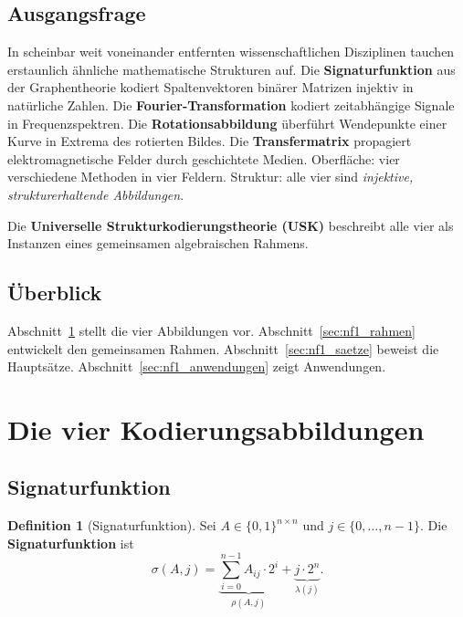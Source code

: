 ﻿\documentclass[a4paper,12pt]{scrreprt}
\theoremstyle{definition}
\newtheorem{definition}{Definition}[section]
\begin{document}
\subsection{Ausgangsfrage}

In scheinbar weit voneinander entfernten wissenschaftlichen Disziplinen
tauchen erstaunlich ähnliche mathematische Strukturen auf. Die
\textbf{Signaturfunktion} aus der Graphentheorie kodiert Spaltenvektoren
binärer Matrizen injektiv in natürliche Zahlen. Die
\textbf{Fourier-Transformation} kodiert zeitabhängige Signale in
Frequenzspektren. Die \textbf{Rotationsabbildung} überführt Wendepunkte
einer Kurve in Extrema des rotierten Bildes. Die
\textbf{Transfermatrix} propagiert elektromagnetische Felder durch
geschichtete Medien. Oberfläche: vier verschiedene Methoden in vier
Feldern. Struktur: alle vier sind \emph{injektive, strukturerhaltende
Abbildungen}.

Die \textbf{Universelle Strukturkodierungstheorie (USK)} beschreibt alle
vier als Instanzen eines gemeinsamen algebraischen Rahmens.

\subsection{Überblick}

Abschnitt~\ref{sec:nf1_vier} stellt die vier Abbildungen vor.
Abschnitt~\ref{sec:nf1_rahmen} entwickelt den gemeinsamen Rahmen.
Abschnitt~\ref{sec:nf1_saetze} beweist die Hauptsätze.
Abschnitt~\ref{sec:nf1_anwendungen} zeigt Anwendungen.

\section{Die vier Kodierungsabbildungen}
\label{sec:nf1_vier}

\subsection{Signaturfunktion}

\begin{definition}[Signaturfunktion]
  Sei $A \in \{0,1\}^{n \times n}$ und $j \in \{0,\ldots,n-1\}$. Die
  \textbf{Signaturfunktion} ist
  \[
    \sigma(A, j) = \underbrace{\sum_{i=0}^{n-1} A_{ij} \cdot 2^i}_{\rho(A,j)}
    + \underbrace{j \cdot 2^n}_{\lambda(j)}.
  \]
\end{definition}
\end{document}
